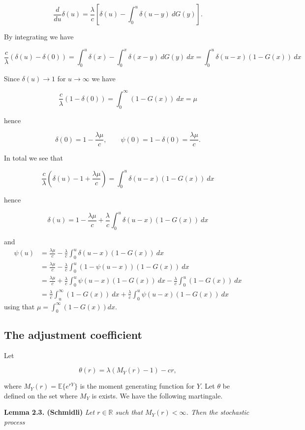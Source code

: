 \documentclass[a4paper,10pt,openany]{book}
\begin{document}
\[
\frac{d}{du}\delta(u)=\frac{\lambda}{c}\left[\delta(u)-\int_0^u\delta(u-y)\ dG(y)\right].
\]

By integrating we have

\[
\frac{c}{\lambda}(\delta(u)-\delta(0))=\int_0^u \delta(x)-\int_0^x\delta(x-y)\ dG(y)\ dx=\int_0^u\delta(u-x)(1-G(x))\ dx
\]

Since \(\delta(u)\to 1\) for \(u\to\infty\) we have

\[
\frac{c}{\lambda}(1-\delta(0))= \int_0^\infty(1-G(x))\ dx=\mu
\]

hence

\[
\delta(0)=1-\frac{\lambda\mu}{c},\qquad \psi(0)=1-\delta(0)=\frac{\lambda\mu}{c}.
\]

In total we see that

\[
\frac{c}{\lambda}\left(\delta(u)-1+\frac{\lambda\mu}{c}\right)=\int_0^u\delta(u-x)(1-G(x))\ dx
\]

hence

\[
\delta(u)=1-\frac{\lambda\mu}{c}+\frac{\lambda}{c}\int_0^u\delta(u-x)(1-G(x))\ dx
\]

and
\begin{align*}
\psi(u)&=\frac{\lambda\mu}{c}-\frac{\lambda}{c}\int_0^u\delta(u-x)(1-G(x))\ dx\\
&=\frac{\lambda\mu}{c}-\frac{\lambda}{c}\int_0^u(1-\psi(u-x))(1-G(x))\ dx\\
&=\frac{\lambda\mu}{c}+\frac{\lambda}{c}\int_0^u\psi(u-x)(1-G(x))\ dx-\frac{\lambda}{c}\int_0^u(1-G(x))\ dx\\
&=\frac{\lambda}{c}\int_u^\infty (1-G(x))\ dx+\frac{\lambda}{c}\int_0^u\psi(u-x)(1-G(x))\ dx
\end{align*}
using that \(\mu=\int_0^\infty (1-G(x)) dx\).

\hypertarget{the-adjustment-coefficient}{%
\subsection{The adjustment coefficient}\label{the-adjustment-coefficient}}

Let

\[
\theta(r)=\lambda(M_Y(r)-1)-cr,
\]

where \(M_Y(r)=\mathbb E\{e^{rY}\}\) is the moment generating function for \(Y\). Let \(\theta\) be defined on the set where \(M_Y\) is exists. We have the following martingale.

\textbf{Lemma 2.3. (Schmidli)} \emph{Let \(r\in\mathbb R\) such that \(M_Y(r)<\infty\). Then the stochastic process}
\end{document}
